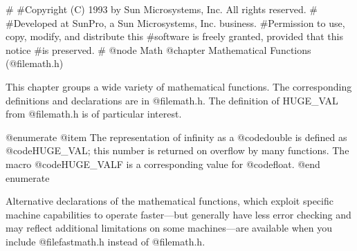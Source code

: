 #
#Copyright (C) 1993 by Sun Microsystems, Inc. All rights reserved.
#
#Developed at SunPro, a Sun Microsystems, Inc. business.
#Permission to use, copy, modify, and distribute this
#software is freely granted, provided that this notice 
#is preserved.
#
@node Math
@chapter Mathematical Functions (@file{math.h})

This chapter groups a wide variety of mathematical functions.  The
corresponding definitions and declarations are in @file{math.h}.  
The definition of HUGE_VAL from @file{math.h} is of particular interest.

@enumerate
@item
The representation of infinity as a @code{double} is defined as
@code{HUGE_VAL}; this number is returned on overflow by many functions.
The macro @code{HUGE_VALF} is a corresponding value for @code{float}.
@end enumerate

Alternative declarations of the mathematical functions, which exploit
specific machine capabilities to operate faster---but generally have
less error checking and may reflect additional limitations on some
machines---are available when you include @file{fastmath.h} instead of
@file{math.h}.

